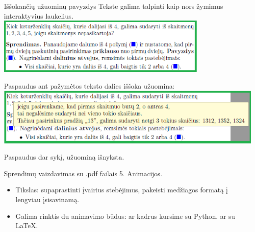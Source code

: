 \documentclass{beamer}
\begin{document}
\begin{frame}[fragile]{Iššokančių užuominų pavyzdys}
Tekste galima talpinti kaip nors žymimus interaktyvius laukelius. 
\includegraphics[width = 0.78\textwidth]{tooltips1.png}

Paspaudus ant pažymėtos teksto dalies iššoka užuomina:
\includegraphics[width = \textwidth]{tooltips2.png}

Paspaudus dar sykį, užuominą išnyksta.
\end{frame}

\begin{frame}[fragile]{Sprendimų vaizdavimas su .pdf failais}
5. Animacijos.
\begin{itemize}
\item Tikslas: supaprastinti įvairius stebėjimus, pakeisti medžiagos formatą į lengviau įsisavinamą.
\item Galima rinktis du animavimo būdus: ar kadrus kursime su Python, ar su LaTeX.
\end{itemize}
\end{frame}
\end{document}
